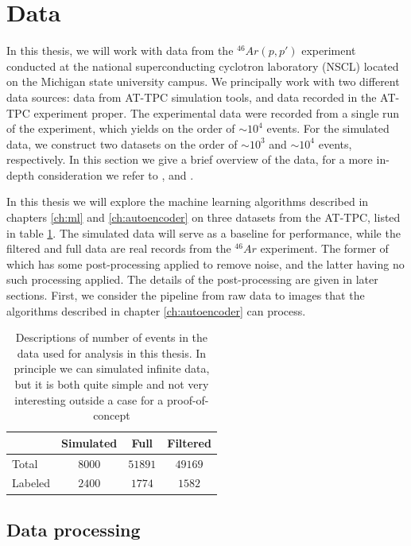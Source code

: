 \section{Data}\label{sec:data}

In this thesis, we will work with data from the ${}^{46}Ar(p, p')$ experiment conducted at the national superconducting cyclotron laboratory (NSCL) located on the Michigan state university campus. We principally work with two different data sources: data from AT-TPC simulation tools, and data recorded in the AT-TPC experiment proper. The experimental data were recorded from a single run of the experiment, which yields on the order of $\sim 10^4$ events.    For the simulated data, we construct two datasets on the order of $\sim10^3$ and $\sim10^4$ events, respectively. In this section we give a brief overview of the data, for a more in-depth consideration we refer to \cite{Mittig2015}, \cite{Suzuki2012} and  \cite{Bradt2017a}. 

In this thesis we will explore the machine learning algorithms described in chapters \ref{ch:ml} and \ref{ch:autoencoder} on three datasets from the AT-TPC, listed in table \ref{tab:datasets}. The simulated data will serve as a baseline for performance, while the filtered and full data are real records from the ${}^{46}Ar$ experiment. The former of which has some post-processing applied to remove noise, and the latter having no such processing applied. The details of the post-processing are given in later sections. First, we consider the pipeline from raw data to images that the algorithms described in chapter \ref{ch:autoencoder} can process. 

\begin{table}[H]
\centering
\caption{Descriptions of number of events in the data used for analysis in this thesis. In principle we can simulated infinite data, but it is both quite simple and not very interesting outside a case for a proof-of-concept}\label{tab:datasets}
\begin{tabular}{lccc}
\toprule
{} & Simulated & Full & Filtered \\
\midrule
Total &  $8000$ & $51891$ & $49169$ \\
Labeled & $2400$ & $1774$ &  $1582$ \\ 
\bottomrule
\end{tabular}
\end{table}

\subsection{Data processing}

